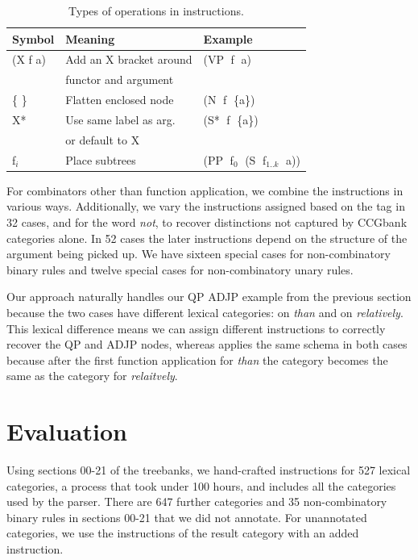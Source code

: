 \begin{table}
\centering
\begin{tabular}{lll}
	\hline
		Symbol & Meaning & Example \\
	\hline
	\hline
		(X f a) & Add an X bracket around & (VP$\;$ f$\;$ a) \\
		& functor and argument \\
		\{ \} & Flatten enclosed node & (N$\;$ f$\;$ \{a\}) \\
		X* & Use same label as arg. & (S*$\;$ f$\;$ \{a\}) \\
		& or default to X \\
		f$_i$ & Place subtrees &  (PP$\;$ f$_0$$\;$ (S$\;$ f$_{1..k}$$\;$ a)) \\
	\hline
\end{tabular}
\caption{\label{tab:operators}
Types of operations in instructions.
}
\end{table}

For combinators other than function application, we combine the instructions in
various ways.  Additionally, we vary the instructions assigned based on the
\pos tag in 32 cases, and for the word \textit{not}, to recover distinctions
not captured by CCGbank categories alone.  In 52 cases the later
instructions depend on the structure of the argument being picked up.  We have
sixteen special cases for non-combinatory binary rules and twelve special
cases for non-combinatory unary rules.

Our approach naturally handles our QP \myvs ADJP example from the previous section because the two cases
have different lexical categories: {\small{}}
on \textit{than} and {\small {}} on \textit{relatively}.  This
lexical difference means we can assign different instructions to correctly
recover the QP and ADJP nodes, whereas \old applies the same schema in both
cases because after the first function application for \textit{than} the category becomes the same as the category for \textit{relaitvely}.

\section{Evaluation}

Using sections 00-21 of the treebanks, we hand-crafted instructions for 527 lexical categories, a process that took under 100 hours, and includes all the categories used by the \candc parser.
There are 647 further categories and 35 non-combinatory binary rules in sections 00-21 that we did not annotate.
For unannotated categories, we use the instructions of the result category with an added instruction.

